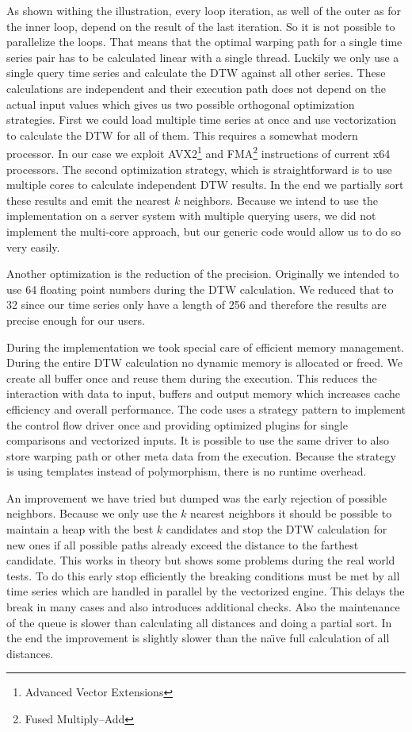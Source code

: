 As shown withing the illustration, every loop iteration, as well of the outer as for the inner loop, depend on the result of the last iteration. So it is not possible to parallelize the loops. That means that the optimal warping path for a single time series pair has to be calculated linear with a single thread. Luckily we only use a single query time series and calculate the DTW against all other series. These calculations are independent and their execution path does not depend on the actual input values which gives us two possible orthogonal optimization strategies. First we could load multiple time series at once and use vectorization to calculate the DTW for all of them. This requires a somewhat modern processor. In our case we exploit AVX2\footnote{Advanced Vector Extensions} and FMA\footnote{Fused Multiply–Add} instructions of current x64 processors. The second optimization strategy, which is straightforward is to use multiple cores to calculate independent DTW results. In the end we partially sort these results and emit the nearest $k$ neighbors. Because we intend to use the implementation on a server system with multiple querying users, we did not implement the multi-core approach, but our generic code would allow us to do so very easily.

Another optimization is the reduction of the precision. Originally we intended to use \SI{64}{\bit} floating point numbers during the DTW calculation. We reduced that to \SI{32}{\bit} since our time series only have a length of \num{256} and therefore the results are precise enough for our users.

During the implementation we took special care of efficient memory management. During the entire DTW calculation no dynamic memory is allocated or freed. We create all buffer once and reuse them during the execution. This reduces the interaction with data to input, buffers and output memory which increases cache efficiency and overall performance. The code uses a strategy pattern to implement the control flow driver once and providing optimized plugins for single comparisons and vectorized inputs. It is possible to use the same driver to also store warping path or other meta data from the execution. Because the strategy is using templates instead of polymorphism, there is no runtime overhead.

An improvement we have tried but dumped was the early rejection of possible neighbors. Because we only use the $k$ nearest neighbors it should be possible to maintain a heap with the best $k$ candidates and stop the DTW calculation for new ones if all possible paths already exceed the distance to the farthest candidate. This works in theory but shows some problems during the real world tests. To do this early stop efficiently the breaking conditions must be met by all time series which are handled in parallel by the vectorized engine. This delays the break in many cases and also introduces additional checks. Also the maintenance of the queue is slower than calculating all distances and doing a partial sort. In the end the improvement is slightly slower than the na{\"\i}ve full calculation of all distances.



